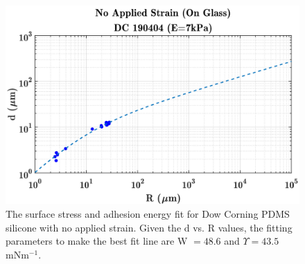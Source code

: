 \begin{figure}[h]
	\centering
	\includegraphics[width=\linewidth]{Chapters/Figures/WUps_fit_DC190404}
	\caption[Dow Corning W-$\Upsilon $ Fit]{The surface stress and adhesion energy fit for Dow Corning PDMS silicone with no applied strain. Given the d vs. R values, the fitting parameters to make the best fit line are W $ = 48.6$ and  $\Upsilon = 43.5$ mNm$^{-1}$.}
	\label{fig:wupsfitdc190404}
\end{figure}

